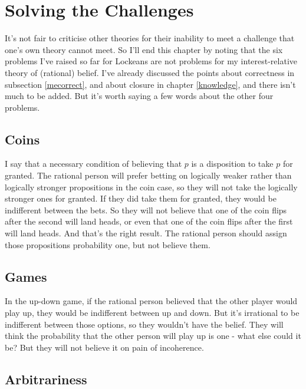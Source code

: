 \documentclass[11pt,]{book}
\begin{document}
\hypertarget{solving}{%
\section{Solving the Challenges}\label{solving}}

It's not fair to criticise other theories for their inability to meet a challenge that one's own theory cannot meet. So I'll end this chapter by noting that the six problems I've raised so far for Lockeans are not problems for my interest-relative theory of (rational) belief. I've already discussed the points about correctness in subsection \ref{mecorrect}, and about closure in chapter \ref{knowledge}, and there isn't much to be added. But it's worth saying a few words about the other four problems.

\hypertarget{coins}{%
\subsection{Coins}\label{coins}}

I say that a necessary condition of believing that \(p\) is a disposition to take \(p\) for granted. The rational person will prefer betting on logically weaker rather than logically stronger propositions in the coin case, so they will not take the logically stronger ones for granted. If they did take them for granted, they would be indifferent between the bets. So they will not believe that one of the coin flips after the second will land heads, or even that one of the coin flips after the first will land heads. And that's the right result. The rational person should assign those propositions probability one, but not believe them.

\hypertarget{games}{%
\subsection{Games}\label{games}}

In the up-down game, if the rational person believed that the other player would play up, they would be indifferent between up and down. But it's irrational to be indifferent between those options, so they wouldn't have the belief. They will think the probability that the other person will play up is one - what else could it be? But they will not believe it on pain of incoherence.

\hypertarget{arbitrariness}{%
\subsection{Arbitrariness}\label{arbitrariness}}
\end{document}
